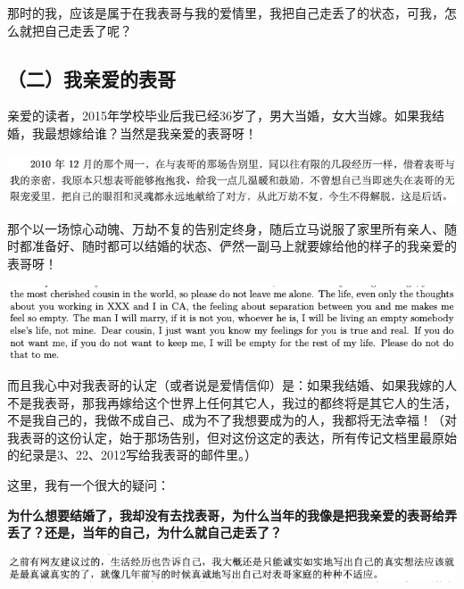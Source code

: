 \documentclass[9pt, b5paper]{article}
\begin{document}
那时的我，应该是属于在我表哥与我的爱情里，我把自己走丢了的状态，可我，怎么就把自己走丢了呢？

\subsection{（二）我亲爱的表哥}
\label{sec:org254d4e6}

亲爱的读者，2015年学校毕业后我已经36岁了，男大当婚，女大当嫁。如果我结婚，我最想嫁给谁？当然是我亲爱的表哥呀！

\begin{center}
\includegraphics[width=.9\linewidth]{./pic/backups_plans_20210426_112346.png}
\end{center}

那个以一场惊心动魄、万劫不复的告别定终身，随后立马说服了家里所有亲人、随时都准备好、随时都可以结婚的状态、俨然一副马上就要嫁给他的样子的我亲爱的表哥呀！

\begin{center}
\includegraphics[width=.9\linewidth]{./pic/backups_plans_20210423_201706.png}
\end{center}

而且我心中对我表哥的认定（或者说是爱情信仰）是：如果我结婚、如果我嫁的人不是我表哥，那我再嫁给这个世界上任何其它人，我过的都终将是其它人的生活，不是我自己的，我做不成自己、成为不了我想要成为的人，我都将无法幸福！（对我表哥的这份认定，始于那场告别，但对这份这定的表达，所有传记文档里最原始的纪录是3、22、2012写给我表哥的邮件里。）

这里，我有一个很大的疑问：

\textbf{为什么想要结婚了，我却没有去找表哥，为什么当年的我像是把我亲爱的表哥给弄丢了？还是，当年的自己，为什么就自己走丢了？}

\begin{center}
\includegraphics[width=.9\linewidth]{./pic/backups_plans_20210426_112108.png}
\end{center}
\end{document}
